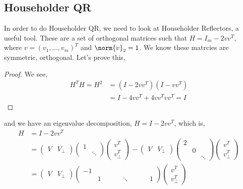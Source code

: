 
\subsection{Householder QR}
In order to do Householder QR, we need to look at Householder Reflectors, a useful tool. These are a set of orthogonal matrices such that $H = I_m - 2vv^T$, where $v = (v_1, \dots, v_m)^T$ and $\norm{v}_2 = 1$. We know these matrcies are symmetric, orthogonal. Let's prove this,
\begin{proof}
  We see,
  \begin{align*}
    H^TH = H^2 &= (I - 2vv^T)(I - vv^T) \\
    &= I - 4vv^T + 4vv^Tvv^T = I
  \end{align*}
\end{proof}
and we have an eigenvalue decomposition, $H = I - 2vv^T$, which is,
\begin{align*}
  H &= I - 2vv^T \\
  &= \begin{pmatrix}
    V & V_\perp
\end{pmatrix} \begin{pmatrix}
  1 & \\
  & \ddots
\end{pmatrix} \begin{pmatrix}
  v^T \\ v_\perp^T
\end{pmatrix} - \begin{pmatrix}
  V & V_\perp
\end{pmatrix} \begin{pmatrix}
2 & & \\
& 0 & \\
&& \ddots
\end{pmatrix} \begin{pmatrix}
v^T \\ v_\perp^T
\end{pmatrix} \\
&= \begin{pmatrix}
  V & V_\perp
\end{pmatrix} \begin{pmatrix}
-1 &&& \\
& 1 & &
& &\ddots&
&&& 1
\end{pmatrix} \begin{pmatrix}
v^T \\ v_\perp^T
\end{pmatrix}
\end{align*}
